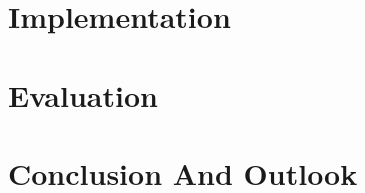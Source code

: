 \documentclass[
	paper=a4,
	open=right, %
	twoside=true,
	fontsize=11pt,
	parskip=full %
]{scrreprt}
\begin{document}
    \chapter{Implementation}\label{ch:implementation}
    

    \chapter{Evaluation}\label{ch:evaluation}
    

    \chapter{Conclusion And Outlook}\label{ch:conclusion}
    

    \glsaddall %
    \printglossaries
	
    \printbibliography[heading=bibintoc]
\end{document}
